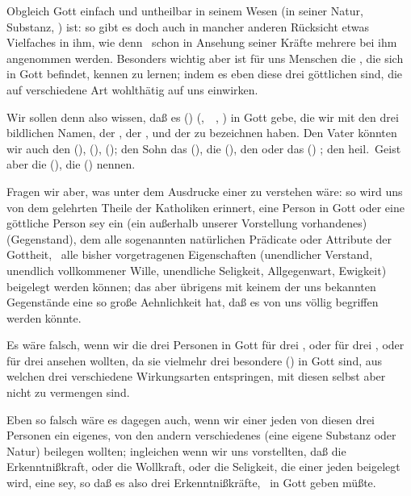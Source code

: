 \begin{aufza}
\item Obgleich Gott einfach und untheilbar in seinem Wesen (in seiner Natur, Substanz, ) ist: so gibt es doch auch in mancher anderen Rücksicht etwas Vielfaches in ihm, wie denn \zB\ schon in Ansehung seiner Kräfte mehrere bei ihm angenommen werden. Besonders wichtig aber ist für uns Menschen die , die sich in Gott befindet, kennen zu lernen; indem es eben diese drei göttlichen  sind, die auf verschiedene Art wohlthätig auf uns einwirken.
\item Wir sollen denn also wissen, daß es  ()  (,~\ , ) in Gott gebe, die wir mit den drei bildlichen Namen, der , der , und der  zu bezeichnen haben. Den Vater könnten wir auch den  (),  (),  (); den Sohn das  (), die  (), den  oder das  () ; den heil.\ Geist aber die  (), die  () nennen.
\item Fragen wir aber, was unter dem Ausdrucke einer  zu verstehen wäre: so wird uns von dem gelehrten Theile der Katholiken erinnert, eine Person in Gott oder eine göttliche Person sey ein  (ein außerhalb unserer Vorstellung vorhandenes)  (Gegenstand), dem alle sogenannten natürlichen Prädicate oder Attribute der Gottheit, \dh\ alle bisher vorgetragenen Eigenschaften (unendlicher Verstand, unendlich vollkommener Wille, unendliche Seligkeit, Allgegenwart, Ewigkeit) beigelegt werden können; das aber übrigens mit keinem der uns bekannten Gegenstände eine so große Aehnlichkeit hat, daß es von uns völlig begriffen werden könnte.
\item Es wäre falsch, wenn wir die drei Personen in Gott für drei , oder für drei , oder für drei  ansehen wollten, da sie vielmehr drei besondere  () in Gott sind, aus welchen drei verschiedene Wirkungsarten entspringen, mit diesen selbst aber nicht zu vermengen sind.
\item Eben so falsch wäre es dagegen auch, wenn wir einer jeden von diesen drei Personen ein eigenes, von den andern verschiedenes  (eine eigene Substanz oder Natur) beilegen wollten; ingleichen wenn wir uns vorstellten, daß die Erkenntnißkraft, oder die Wollkraft, oder die Seligkeit, die einer jeden beigelegt wird, eine  sey, so daß es also drei Erkenntnißkräfte, \usw\ in Gott geben müßte.

\end{aufza}
